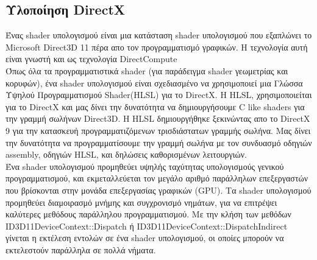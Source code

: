\subsection{Υλοποίηση DirectX}
Ένας shader υπολογισμού είναι μια κατάσταση shader υπολογισμού που εξαπλώνει το Microsoft Direct3D 11 πέρα απο τον προγραμματισμό γραφικών. Η τεχνολογία αυτή είναι γνωστή και ως τεχνολογία DirectCompute\cite{computeshaders-4}
\\Όπως όλα τα προγραμματιστικά shader (για παράδειγμα shader γεωμετρίας και κορυφών), ένα shader υπολογισμού είναι σχεδιασμένο να χρησιμοποιεί μια Γλώσσα Υψηλού Προγραμματισμού Shader(HLSL) για το DirectX. Η HLSL, χρησιμοποιείται για το DirectX και μας δίνει την δυνατότητα να δημιουργήσουμε C like shaders για την γραμμή σωλήνων Direct3D. Η HLSL δημιουργήθηκε ξεκινώντας απο το DirectX 9 για την κατασκευή προγραμματιζόμενων τρισδιάστατων γραμμής σωλήνα. Μας δίνει την δυνατότητα να προγραμματίσουμε την γραμμή σωλήνα με τον συνδυασμό οδηγιών assembly, οδηγιών HLSL, και δηλώσεις καθορισμένων λειτουργιών.\\
Ένα shader υπολογισμού προμηθεύει υψηλής ταχύτητας υπολογισμούς γενικού προγραμματισμού, και εκμεταλλεύεται τον μεγάλο αριθμό παράλληλων επεξεργαστών που βρίσκονται στην μονάδα επεξεργασίας γραφικών (GPU). Τα shader υπολογισμού προμηθεύει διαμοιρασμό μνήμης και συγχρονισμό νημάτων, για να επιτρέψει καλύτερες μεθόδους παράλληλου προγραμματισμού. Με την κλήση των μεθόδων ID3D11DeviceContext::Dispatch ή ID3D11DeviceContext::DispatchIndirect γίνεται η εκτέλεση εντολών σε ένα shader υπολογισμού, οι οποίες μπορούν να εκτελεστούν παράλληλα σε πολλά νήματα.